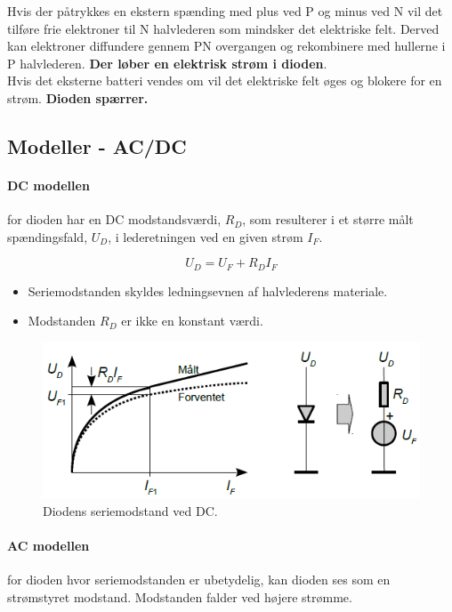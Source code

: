 \documentclass[danish]{article}
\begin{document}
Hvis der påtrykkes en ekstern spænding med plus ved P og minus ved N vil det tilføre frie elektroner til N halvlederen som mindsker det elektriske felt.
Derved kan elektroner diffundere gennem PN overgangen og rekombinere med hullerne i P halvlederen. \textbf{Der løber en elektrisk strøm i dioden}. \\

Hvis det eksterne batteri vendes om vil det elektriske felt øges og blokere for en strøm. \textbf{Dioden spærrer.}

\newpage
\subsection{Modeller - AC/DC}
\paragraph{DC modellen} for dioden har en DC modstandsværdi, $R_D$, som resulterer i et større målt spændingsfald, $U_D$, i lederetningen ved en given strøm $I_F$.

\begin{equation}
U_D = U_F + R_D I_F
\end{equation}

\begin{itemize}
	\item Seriemodstanden skyldes ledningsevnen af halvlederens materiale.
	\item Modstanden $R_D$ er ikke en konstant værdi.
\end{itemize}

\begin{figure} [H]
	\centering
	\includegraphics[width=0.9\linewidth]{graphics/DC_diode}
	\caption{Diodens seriemodstand ved DC.}
	\label{fig:DC_diode}
\end{figure}

\paragraph{AC modellen} for dioden hvor seriemodstanden er ubetydelig, kan dioden ses som en strømstyret modstand. 
Modstanden falder ved højere strømme.
\end{document}
